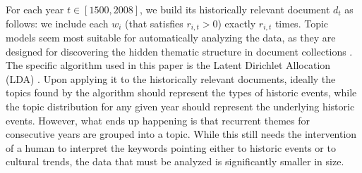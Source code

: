 For each year $t \in \left[ 1500, 2008 \right]$, we build its historically relevant document $d_t$ as follows: we include each $w_i$ (that satisfies $r_{i, t} > 0$) exactly $r_{i, t}$ times. Topic models seem most suitable for automatically analyzing the data, as they are designed for discovering the hidden thematic structure in document collections . The specific algorithm used in this paper is the Latent Dirichlet Allocation (LDA) . Upon applying it to the historically relevant documents, ideally the topics found by the algorithm should represent the types of historic events, while the topic distribution for any given year should represent the underlying historic events. However, what ends up happening is that recurrent themes for consecutive years are grouped into a topic. While this still needs the intervention of a human to interpret the keywords pointing either to historic events or to cultural trends, the data that must be analyzed is significantly smaller in size.
